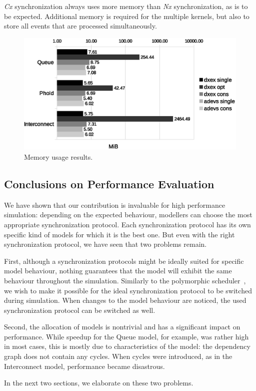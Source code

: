 \textit{Cx} synchronization always uses more memory than \textit{Nx} synchronization, as is to be expected.
Additional memory is required for the multiple kernels, but also to store all events that are processed simultaneously.

\begin{figure}
    \includegraphics[width=\columnwidth]{fig/memory_voorlopig.eps}
    \caption{Memory usage results.}
    \label{fig:memory}
\end{figure}

\subsection{Conclusions on Performance Evaluation}
We have shown that our contribution is invaluable for high performance simulation: depending on the expected behaviour, modellers can choose the most appropriate synchronization protocol.
Each synchronization protocol has its own specific kind of models for which it is the best one.
But even with the right synchronization protocol, we have seen that two problems remain.

First, although a synchronization protocols might be ideally suited for specific model behaviour, nothing guarantees that the model will exhibit the same behaviour throughout the simulation.
Similarly to the polymorphic scheduler~\cite{MasterThesis}, we wish to make it possible for the ideal synchronization protocol to be switched during simulation.
When changes to the model behaviour are noticed, the used synchronization protocol can be switched as well. 

Second, the allocation of models is nontrivial and has a significant impact on performance.
While speedup for the Queue model, for example, was rather high in most cases, this is mostly due to characteristics of the model: the dependency graph does not contain any cycles.
When cycles were introduced, as in the Interconnect model, performance became disastrous.

In the next two sections, we elaborate on these two problems.

